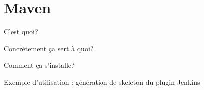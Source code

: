\chapter{Maven}\label{annexe:maven}


C'est quoi?

Concr\`{e}tement \c{c}a sert \`{a} quoi?

Comment \c{c}a s'installe?

Exemple d'utilisation : g\'{e}n\'{e}ration de skeleton du plugin Jenkins


